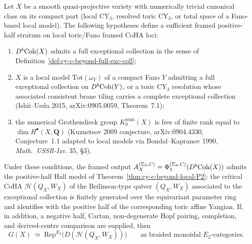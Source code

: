 \begin{theorem}
\label{thm:cy-c-beyond-exceptional-stratum}
Let $X$ be a smooth quasi-projective variety with numerically trivial
canonical class on its compact part (local CY$_3$, resolved toric CY$_3$,
or total space of a Fano-based local model). The following hypotheses
define a sufficient framed positive-half stratum on local toric/Fano
framed CoHA loci:
\begin{enumerate}[label=\textup{(\roman*)}]
 \item $D^b\mathrm{Coh}(X)$ admits a full exceptional collection in the sense of
 Definition~\ref{def:cy-c-beyond-full-exc-coll};
 \item $X$ is a local model $\mathrm{Tot}(\omega_Y)$ of a compact Fano $Y$
 admitting a full exceptional collection on $D^b\mathrm{Coh}(Y)$, or a toric
 CY$_3$ resolution whose associated consistent brane tiling carries
 a complete exceptional collection (Ishii--Ueda 2015,
 arXiv:0905.0059, Theorem~7.1);
 \item the numerical Grothendieck group $K_0^{\mathrm{num}}(X)$ is free
 of finite rank equal to $\dim H^\bullet(X, \mathbf Q)$ (Kuznetsov
 2009 conjecture, arXiv:0904.4330, Conjecture~1.1 adapted to
 local models via Bondal--Kapranov 1990, \emph{Math.\ USSR-Izv.}
 35, \S 3).
\end{enumerate}
Under these conditions, the framed output
$A_X^{(\Sigma_2,C)} = \Phi_3^{(\Sigma_2,C)}(D^b\mathrm{Coh}(X))$ admits the
positive-half Hall model of Theorem~\ref{thm:cy-c-beyond-local-P2}: the critical CoHA
$\mathcal{H}(Q_X, W_X)$ of the Beilinson-type quiver
$(Q_X, W_X)$ associated to the exceptional collection is finitely
generated over the equivariant parameter ring and identifies with the
positive half of the corresponding toric affine Yangian. If, in
addition, a negative half, Cartan, non-degenerate Hopf pairing,
completion, and derived-centre comparison are supplied, then
\[
 G(X) \;\simeq\; \mathrm{Rep}^{E_2}\!\bigl( D(\mathcal H(Q_X, W_X)) \bigr)
 \qquad \text{as braided monoidal } E_2\text{-categories.}
\]
\end{theorem}

